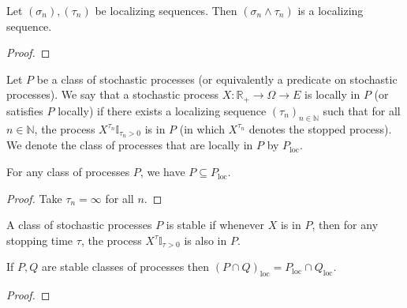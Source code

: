 \begin{lemma}\label{lem:localizingSequence_min}
Let $(\sigma_n), (\tau_n)$ be localizing sequences.
Then $(\sigma_n \wedge \tau_n)$ is a localizing sequence.
\end{lemma}

\begin{proof}

\end{proof}


\begin{definition}\label{def:locally}
  \leanok
Let $P$ be a class of stochastic processes (or equivalently a predicate on stochastic processes).
We say that a stochastic process $X : \mathbb{R}_+ \to \Omega \to E$ is locally in $P$ (or satisfies $P$ locally) if there exists a localizing sequence $(\tau_n)_{n \in \mathbb{N}}$ such that for all $n \in \mathbb{N}$, the process $X^{\tau_n}\mathbb{I}_{\tau_n > 0}$ is in $P$ (in which $X^{\tau_n}$ denotes the stopped process).
We denote the class of processes that are locally in $P$ by $P_{\mathrm{loc}}$.
\end{definition}


\begin{lemma}\label{lem:implies_locally}
  \leanok
For any class of processes $P$, we have $P \subseteq P_{\mathrm{loc}}$.
\end{lemma}

\begin{proof}
Take $\tau_n = \infty$ for all $n$.
\end{proof}


\begin{definition}\label{def:stable}
  \leanok
A class of stochastic processes $P$ is stable if whenever $X$ is in $P$, then for any stopping time $\tau$, the process $X^{\tau}\mathbb{I}_{\tau > 0}$ is also in $P$.
\end{definition}


\begin{lemma}\label{lem:locally_inter}
If $P, Q$ are stable classes of processes then $(P\cap Q)_{\mathrm{loc}} = P_{\mathrm{loc}}\cap Q_{\mathrm{loc}}$.
\end{lemma}

\begin{proof}

\end{proof}


